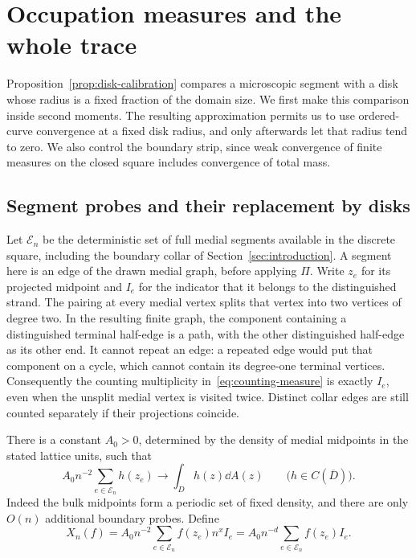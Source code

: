 \section{Occupation measures and the whole trace}
\label{sec:occupation}

Proposition~\ref{prop:disk-calibration} compares a microscopic segment
with a disk whose radius is a fixed fraction of the domain size.  We
first make this comparison inside second moments.  The resulting
approximation permits us to use ordered-curve convergence at a fixed
disk radius, and only afterwards let that radius tend to zero.  We
also control the boundary strip, since weak convergence of finite
measures on the closed square includes convergence of total mass.

\subsection{Segment probes and their replacement by disks}

Let $\mathcal E_n$ be the deterministic set of full medial segments
available in the discrete square, including the boundary collar of
Section~\ref{sec:introduction}.  A segment here is an edge of the drawn
medial graph, before applying $\Pi$.  Write $z_e$ for its projected
midpoint and $I_e$ for the indicator that it belongs to the distinguished
strand.  The pairing at every medial vertex splits that vertex into
two vertices of degree two.  In the resulting finite graph, the
component containing a distinguished terminal half-edge is a path,
with the other distinguished half-edge as its other end.  It cannot
repeat an edge: a repeated edge would put that component on a cycle,
which cannot contain its degree-one terminal vertices.  Consequently
the counting multiplicity in~\eqref{eq:counting-measure} is exactly
$I_e$, even when the unsplit medial vertex is visited twice.  Distinct
collar edges are still counted separately if their projections coincide.

There is a constant $A_0>0$, determined by the density of medial
midpoints in the stated lattice units, such that
\begin{equation}
 A_0n^{-2}\sum_{e\in\mathcal E_n}h(z_e)
 \longrightarrow \int_D h(z)\dd A(z)
 \qquad\bigl(h\in C(\overline D)\bigr).
 \label{eq:probe-riemann}
\end{equation}
Indeed the bulk midpoints form a periodic set of fixed density, and
there are only $O(n)$ additional boundary probes.  Define
\begin{equation}
 X_n(f)=A_0n^{-2}\sum_{e\in\mathcal E_n}f(z_e)n^x I_e
       =A_0n^{-d}\sum_{e\in\mathcal E_n}f(z_e)I_e.
 \label{eq:microscopic-test}
\end{equation}

